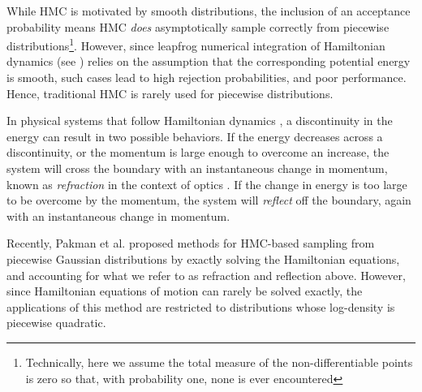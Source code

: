\documentclass{article} %
\begin{document}

While HMC is motivated by smooth distributions, the inclusion of an acceptance probability means HMC \emph{does} asymptotically sample correctly from piecewise distributions\footnote{Technically, here we assume the total measure of the non-differentiable points is zero so that, with probability one, none is ever encountered}.  However, since leapfrog numerical integration of Hamiltonian dynamics (see \cite{neal2011mcmc}) relies on the assumption that the corresponding potential energy is smooth, such cases lead to high rejection probabilities, and poor performance.  Hence, traditional HMC is rarely used for piecewise distributions.

In physical systems that follow Hamiltonian dynamics \cite{greenwood1988principles}, a discontinuity in the energy can result in two possible behaviors.  If the energy decreases across a discontinuity, or the momentum is large enough to overcome an increase, the system will cross the boundary with an instantaneous change in momentum, known as \emph{refraction} in the context of optics \cite{buchdahl1993introduction}.  If the change in energy is too large to be overcome by the momentum, the system will \emph{reflect} off the boundary, again with an instantaneous change in momentum.



Recently, Pakman et al. \cite{pakman2014exact, pakman2013auxiliary} proposed methods for HMC-based sampling from piecewise Gaussian distributions by exactly solving the Hamiltonian equations, and accounting for what we refer to as refraction and reflection above.  However, since Hamiltonian equations of motion can rarely be solved exactly, the applications of this method are restricted to distributions whose log-density is piecewise quadratic.

\end{document}
